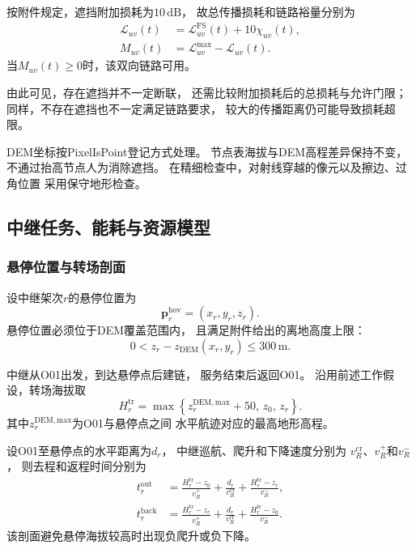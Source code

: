 \documentclass[bwprint]{gmcmthesis}
\begin{document}
按附件规定，遮挡附加损耗为$10\,\mathrm{dB}$，
故总传播损耗和链路裕量分别为
\begin{align}
    \mathcal{L}_{uv}(t)
    &=
    \mathcal{L}_{uv}^{\mathrm{FS}}(t)
    +10\chi_{uv}(t),\\
    M_{uv}(t)
    &=
    \mathcal{L}_{uv}^{\max}
    -\mathcal{L}_{uv}(t).
\end{align}
当$M_{uv}(t)\geq0$时，该双向链路可用。

由此可见，存在遮挡并不一定断联，
还需比较附加损耗后的总损耗与允许门限；
同样，不存在遮挡也不一定满足链路要求，
较大的传播距离仍可能导致损耗超限。

DEM坐标按PixelIsPoint登记方式处理。
节点表海拔与DEM高程差异保持不变，
不通过抬高节点人为消除遮挡。
在精细检查中，对射线穿越的像元以及擦边、过角位置
采用保守地形检查。

\subsection{中继任务、能耗与资源模型}

\subsubsection{悬停位置与转场剖面}

设中继架次$r$的悬停位置为
\begin{equation}
    \boldsymbol{p}_r^{\mathrm{hov}}
    =
    (x_r,y_r,z_r).
\end{equation}
悬停位置必须位于DEM覆盖范围内，
且满足附件给出的离地高度上限：
\begin{equation}
    0<
    z_r-z_{\mathrm{DEM}}(x_r,y_r)
    \leq300\,\mathrm{m}.
\end{equation}

中继从O01出发，到达悬停点后建链，
服务结束后返回O01。
沿用前述工作假设，转场海拔取
\begin{equation}
    H_r^{\mathrm{tr}}
    =
    \max\left\{
    z_r^{\mathrm{DEM,max}}+50,\,
    z_0,\,
    z_r
    \right\}.
\end{equation}
其中$z_r^{\mathrm{DEM,max}}$为O01与悬停点之间
水平航迹对应的最高地形高程。

设O01至悬停点的水平距离为$d_r$，
中继巡航、爬升和下降速度分别为
$v_R^{\mathrm{cr}}$、$v_R^{+}$和$v_R^{-}$，
则去程和返程时间分别为
\begin{align}
    t_r^{\mathrm{out}}
    &=
    \frac{H_r^{\mathrm{tr}}-z_0}{v_R^{+}}
    +\frac{d_r}{v_R^{\mathrm{cr}}}
    +\frac{H_r^{\mathrm{tr}}-z_r}{v_R^{-}},\\
    t_r^{\mathrm{back}}
    &=
    \frac{H_r^{\mathrm{tr}}-z_r}{v_R^{+}}
    +\frac{d_r}{v_R^{\mathrm{cr}}}
    +\frac{H_r^{\mathrm{tr}}-z_0}{v_R^{-}}.
\end{align}
该剖面避免悬停海拔较高时出现负爬升或负下降。
\end{document}
